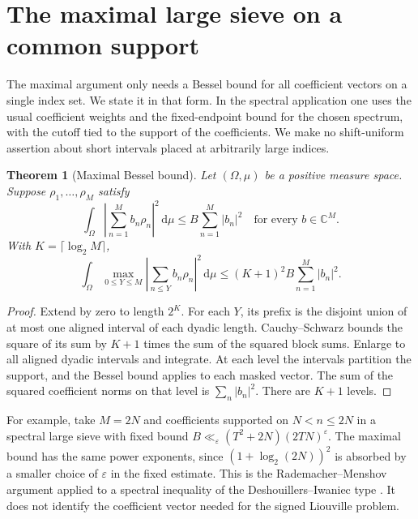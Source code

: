 \documentclass[11pt]{amsart}
\newtheorem{theorem}{Theorem}[section]
\theoremstyle{definition}
\theoremstyle{remark}
\newcommand{\dd}{\,\mathrm d}
\numberwithin{equation}{section}
\begin{document}


\section{The maximal large sieve on a common support}\label{sec:sieve}

The maximal argument only needs a Bessel bound for all coefficient vectors on a single index set. We state it in that form. In the spectral application one uses the usual coefficient weights and the fixed-endpoint bound for the chosen spectrum, with the cutoff tied to the support of the coefficients. We make no shift-uniform assertion about short intervals placed at arbitrarily large indices.

\begin{theorem}[Maximal Bessel bound]\label{thm:bessel}
Let \((\Omega,\mu)\) be a positive measure space. Suppose \(\rho_1,\ldots,\rho_M\) satisfy
\[
 \int_{\Omega}\left|\sum_{n=1}^M b_n\rho_n\right|^2\dd\mu
 \le B\sum_{n=1}^M|b_n|^2
 \quad\text{for every }b\in\mathbb C^M.
\]
With \(K=\lceil\log_2 M\rceil\),
\[
 \int_{\Omega}\max_{0\le Y\le M}\left|\sum_{n\le Y}b_n\rho_n\right|^2\dd\mu
 \le (K+1)^2 B\sum_{n=1}^M|b_n|^2.
\]
\end{theorem}
\begin{proof}
Extend by zero to length \(2^K\). For each \(Y\), its prefix is the disjoint union of at most one aligned interval of each dyadic length. Cauchy--Schwarz bounds the square of its sum by \(K+1\) times the sum of the squared block sums. Enlarge to all aligned dyadic intervals and integrate. At each level the intervals partition the support, and the Bessel bound applies to each masked vector. The sum of the squared coefficient norms on that level is \(\sum_n|b_n|^2\). There are \(K+1\) levels.
\end{proof}

For example, take \(M=2N\) and coefficients supported on \(N<n\le2N\) in a spectral large sieve with fixed bound \(B\ll_\varepsilon (T^2+2N)(2TN)^\varepsilon\). The maximal bound has the same power exponents, since \((1+\log_2(2N))^2\) is absorbed by a smaller choice of \(\varepsilon\) in the fixed estimate. This is the Rademacher--Menshov argument applied to a spectral inequality of the Deshouillers--Iwaniec type \cite{di,rm}. It does not identify the coefficient vector needed for the signed Liouville problem.
\end{document}
